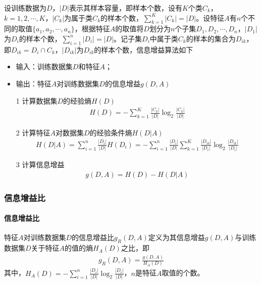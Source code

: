 设训练数据为$D$，$|D|$表示其样本容量，即样本个数，设有$K$个类$C_k$，$k=1,2,\cdots,K$，$|C_k|$为属于类$C_k$的样本个数，$\sum_{k=1}^K|C_k|=|D|$。设特征$A$有$n$个不同的取值$\{ a_1,a_2,\cdots,a_n \}$，根据特征$A$的取值将$D$划分为$n$个子集$D_1,D_2,\cdots,D_n$，$|D_1|$为$D_i$的样本个数，$\sum_{i=1}^n|D_i|=|D|$。记子集$D_i$中属于类$C_k$的样本的集合为$D_{ik}$，即$D_{ik}=D_i\cap C_k$，$|D_{ik}|$为$D_{ik}$的样本个数，信息增益算法如下
\begin{itemize}
\item 输入：训练数据集$D$和特征$A$；
\item 输出：特征$A$对训练数据集$D$的信息增益$g(D,A)$
\item[1] 计算数据集$D$的经验熵$H(D)$
\begin{eqnarray}
H(D)=-\sum_{k=1}^K \frac{|C_k|}{|D|}\log_2\frac{|C_k|}{|D|}
\end{eqnarray}
\item[2] 计算特征$A$对数据集$D$的经验条件熵$H(D|A)$
\begin{eqnarray}
H(D|A)=\sum_{i=1}^n\frac{|D_i|}{|D|}H(D_i)=-\sum_{i=1}^n\frac{|D_i|}{|D|}\sum_{k=1}^K\frac{|D_{ik}|}{|D_i|}\log_2\frac{|D_{ik}|}{|D_i|}
\end{eqnarray}
\item[3] 计算信息增益
\begin{eqnarray}
g(D,A)=H(D)-H(D|A)
\end{eqnarray}
\end{itemize}

\subsubsection{信息增益比}
\paragraph{信息增益比}特征$A$对训练数据集$D$的信息增益比$g_R(D,A)$定义为其信息增益$g(D,A)$与训练数据集$D$关于特征$A$的值的熵$H_A(D)$之比，即
\begin{eqnarray}
g_R(D,A)=\frac{g(D,A)}{H_A(D)}
\end{eqnarray}
其中，$H_A(D)=-\sum_{i=1}^n \frac{|D_i|}{|D|}\log_2\frac{|D_i|}{|D|}$，$n$是特征$A$取值的个数。

















